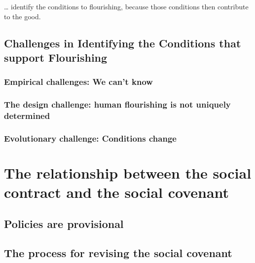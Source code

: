 \documentclass[
]{book}
\begin{document}
\ldots{} identify the conditions to flourishing, because those conditions then contribute to the good.

\hypertarget{challenges-in-identifying-the-conditions-that-support-flourishing}{%
\section{Challenges in Identifying the Conditions that support Flourishing}\label{challenges-in-identifying-the-conditions-that-support-flourishing}}

\hypertarget{empirical-challenges-we-cant-know}{%
\subsection{Empirical challenges: We can't know}\label{empirical-challenges-we-cant-know}}

\hypertarget{the-design-challenge-human-flourishing-is-not-uniquely-determined}{%
\subsection{The design challenge: human flourishing is not uniquely determined}\label{the-design-challenge-human-flourishing-is-not-uniquely-determined}}

\hypertarget{evolutionary-challenge-conditions-change}{%
\subsection{Evolutionary challenge: Conditions change}\label{evolutionary-challenge-conditions-change}}

\hypertarget{the-relationship-between-the-social-contract-and-the-social-covenant}{%
\chapter{The relationship between the social contract and the social covenant}\label{the-relationship-between-the-social-contract-and-the-social-covenant}}

\hypertarget{policies-are-provisional}{%
\section{Policies are provisional}\label{policies-are-provisional}}

\hypertarget{the-process-for-revising-the-social-covenant}{%
\section{The process for revising the social covenant}\label{the-process-for-revising-the-social-covenant}}
\end{document}
